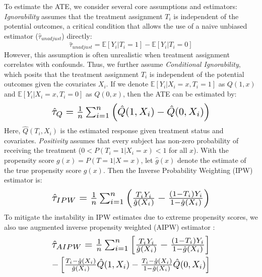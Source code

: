 \documentclass[11pt]{article}
\begin{document}
To estimate the ATE, we consider several core assumptions and estimators: {\sl Ignorability} assumes that the treatment assignment \(T_i\) is independent of the potential outcomes, a critical condition that allows the use of a naive unbiased estimator (\(\hat{\tau}_{unadjust}\)) directly:
\begin{equation}
\label{eq:Q_unadjust}
\hat{\tau}_{unadjust} = \mathbb{E}[Y_i | T_i = 1] - \mathbb{E}[Y_i | T_i = 0]
\end{equation}
However, this assumption is often unrealistic when treatment assignment correlates with confounds. Thus, we further assume {\sl Conditional Ignorability}, which posits that the treatment assignment \(T_i\) is independent of the potential outcomes given the covariates \(X_i\). If we denote \(\mathbb{E}[Y_i | X_i = x, T_i = 1]\) as \(Q(1, x)\) and \(\mathbb{E}[Y_i | X_i = x, T_i = 0]\) as \(Q(0, x)\), then the ATE can be estimated by:
\begin{equation}
\label{eq:Q_ate}
\resizebox{0.65\columnwidth}{!}{$\hat{\tau}_{Q} = \frac{1}{n} \sum_{i=1}^{n} \left(\hat{Q}(1, X_i) - \hat{Q}(0, X_i)\right)$}
\end{equation}
Here, \(\hat{Q}(T_i, X_i)\) is the estimated response given treatment status and covariates. {\sl Positivity} assumes that every subject has non-zero probability of receiving the treatment (\(0 < P(T_i = 1 | X_i = x) < 1\) for all \(x\)). With the propensity score  \(g(x) = P(T = 1 | X = x)\), let $\hat{g}(x)$ denote the estimate of the true propensity score $g(x)$. Then the Inverse Probability Weighting (IPW) estimator is:
\begin{equation}
\resizebox{0.65\columnwidth}{!}{$\hat{\tau}_{IPW} = \frac{1}{n} \sum_{i=1}^{n} \left(\frac{T_i Y_i}{\hat{g}(X_i)} - \frac{(1 - T_i) Y_i}{1 - \hat{g}(X_i)}\right)$}
\end{equation} 
To mitigate the instability in IPW estimates due to extreme propensity scores, we also use augmented inverse propensity weighted (AIPW) estimator \cite{robins1995analysis}:
\begin{multline}
\resizebox{0.65\columnwidth}{!}{$\hat{\tau}_{AIPW} = \frac{1}{n} \sum_{i=1}^{n} \left[ \frac{T_i Y_i}{\hat{g}(X_i)} - \frac{(1 - T_i) Y_i}{1 - \hat{g}(X_i)} \right]$} \\
\resizebox{0.65\columnwidth}{!}{$- \left[ \frac{T_i - \hat{g}(X_i)}{\hat{g}(X_i)} \hat{Q}(1, X_i) - \frac{T_i - \hat{g}(X_i)}{1 - \hat{g}(X_i)} \hat{Q}(0, X_i) \right]$}
\end{multline}
\end{document}
